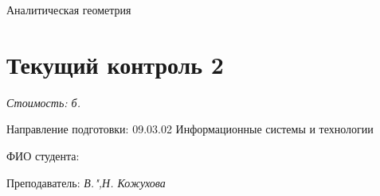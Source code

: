 \documentclass[a4paper, 12pt]{article}
\begin{document}
\thispagestyle{empty}

\vspace{-10ex}
	
\begin{center}
\Huge{Аналитическая геометрия}\\
\vspace{-3ex}
\section*{Текущий контроль 2}
\end{center}
\vspace{-2ex}	
\textit{Стоимость: \pointssum* б.}
\begin{flushleft}
Направление подготовки: 09.03.02 Информационные системы и технологии %

ФИО студента: %
 

Преподаватель: \textit{В.",Н. Кожухова}	
\end{flushleft}	
\end{document}
